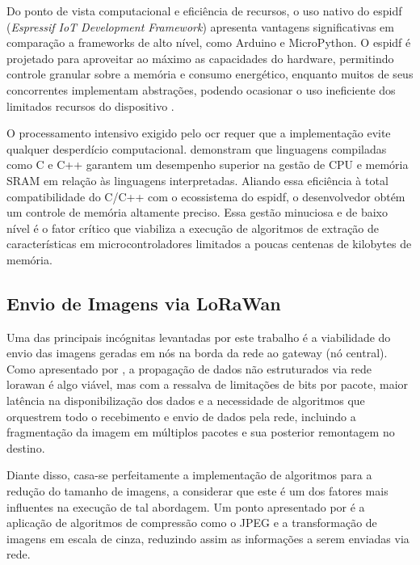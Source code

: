 Do ponto de vista computacional e eficiência de recursos, o uso nativo do \gls{espidf} (\textit{Espressif IoT Development Framework}) apresenta vantagens significativas em comparação a frameworks de alto nível, como Arduino e MicroPython. 
O \gls{espidf} é projetado para aproveitar ao máximo as capacidades do hardware, permitindo controle granular sobre a memória e consumo energético, enquanto muitos de seus concorrentes implementam abstrações, podendo ocasionar o uso ineficiente dos limitados recursos do dispositivo \cite{espidf}.

O processamento intensivo exigido pelo \gls{ocr} requer que a implementação evite qualquer desperdício computacional.
 demonstram que linguagens compiladas como C e C++ garantem um desempenho superior na gestão de CPU e memória SRAM em relação às linguagens interpretadas. 
Aliando essa eficiência à total compatibilidade do C/C++ com o ecossistema do \gls{espidf}, o desenvolvedor obtém um controle de memória altamente preciso. 
Essa gestão minuciosa e de baixo nível é o fator crítico que viabiliza a execução de algoritmos de extração de características em microcontroladores limitados a poucas centenas de kilobytes de memória.


\subsection{Envio de Imagens via LoRaWan}

Uma das principais incógnitas levantadas por este trabalho é a viabilidade 
do envio das imagens geradas em nós na borda da rede ao gateway (nó 
central). Como apresentado por , a propagação 
de dados não estruturados via rede \gls{lorawan} é algo viável, mas com a 
ressalva de limitações de bits por pacote, maior latência na 
disponibilização dos dados e a necessidade de algoritmos que orquestrem 
todo o recebimento e envio de dados pela rede, incluindo a fragmentação 
da imagem em múltiplos pacotes e sua posterior remontagem no destino.

Diante disso, casa-se perfeitamente a implementação de algoritmos para 
a redução do tamanho de imagens, a considerar que este é um dos fatores 
mais influentes na execução de tal abordagem. Um ponto apresentado por 
 é a aplicação de algoritmos de compressão 
como o JPEG e a transformação de imagens em escala de cinza, reduzindo 
assim as informações a serem enviadas via rede.


